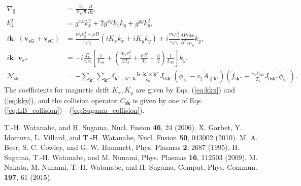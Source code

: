 \begin{align}
  \nabla_\parallel &= \frac{c_b}{B \sqrt{g}} \frac{\partial}{\partial z}, \\
  k_\perp^2 &= g^{xx} k_x^2 + 2 g^{xy} k_x k_y + g^{yy} k_y^2, \\
  i \bm{k} \cdot (\bm{v}_\mathrm{sG} + \bm{v}_\mathrm{sC}) &= \frac{m_\mathrm{s} v_\parallel^2 + \mu B}{e_\mathrm{s} c_b} \left( i K_x k_x + i K_y k_y \right) + i \frac{m_\mathrm{s} v_\parallel^2}{e_\mathrm{s} c_b} \frac{dP/dx}{B^2/\mu_0} k_y, \\
  i \bm{k} \cdot \bm{v}_\mathrm{s*} &= - i \frac{T_\mathrm{s}}{e_\mathrm{s} c_b} \left[ \frac{1}{L_{n\mathrm{s}}} + \left( \frac{m_\mathrm{s} v_\parallel^2}{2T_\mathrm{s}} + \frac{\mu B}{T_\mathrm{s}} - \frac{3}{2} \right) \frac{1}{L_{T\mathrm{s}}} \right] k_y, \\
  \mathcal{N}_{\mathrm{s}\bm{k}} &= - \sum_{\bm{k}'} \sum_{\bm{k}''} \delta_{\bm{k}'+\bm{k}'',\bm{k}}\frac{\bm{b} \cdot \bm{k}' \times \bm{k}''}{c_b} J_{0\mathrm{s}\bm{k}'} \left( \tilde{\phi}_{\bm{k}'} - v_\parallel \tilde{A}_{\parallel\bm{k}'} \right) \left( \tilde{f}_{\mathrm{s}\bm{k}''} + \frac{e_\mathrm{s} F_\mathrm{Ms}}{T_\mathrm{s}} J_{0\mathrm{s}\bm{k}''} \tilde{\phi}_{\bm{k}''} \right).
\end{align}
The coefficients for magnetic drift $K_x, K_y$ are given by Eqs. (\ref{eq:kkx}) and (\ref{eq:kky}), and the collision operator $C_{\mathrm{s}\bm{k}}$ is given by one of Eqs. (\ref{eq:LB_collision}) - (\ref{eq:Sugama_collision}).

\begin{thebibliography}{99}
  T.-H. Watanabe, and H. Sugama,
  Nucl. Fusion {\bf 46}, 24 (2006).
  X. Garbet, Y. Idomura, L. Villard, and T.-H. Watanabe,
  Nucl. Fusion {\bf 50}, 043002 (2010).
  M. A. Beer, S. C. Cowley, and G. W. Hammett,
  Phys. Plasmas {\bf 2}, 2687 (1995).
  H. Sugama, T.-H. Watanabe, and M. Nunami,
  Phys. Plasmas {\bf 16}, 112503 (2009).
  M. Nakata, M. Nunami, T.-H. Watanabe, and H. Sugama,
  Comput. Phys. Commun. {\bf 197}, 61 (2015).
\end{thebibliography}